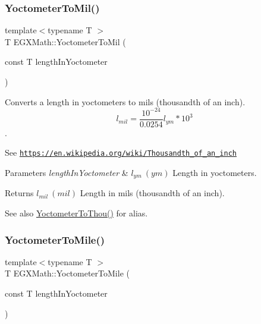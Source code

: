 \subsubsection{\texorpdfstring{Yoctometer\+To\+Mil()}{YoctometerToMil()}}
{\footnotesize\ttfamily template$<$typename T $>$ \\
T E\+G\+X\+Math\+::\+Yoctometer\+To\+Mil (\begin{DoxyParamCaption}\item[{const T}]{length\+In\+Yoctometer }\end{DoxyParamCaption})}



Converts a length in yoctometers to mils (thousandth of an inch). \[ l_{mil}= \frac{10^{-24}}{0.0254} l_{ym} * 10^{3} \]. 

See \href{https://en.wikipedia.org/wiki/Thousandth_of_an_inch}{\tt https\+://en.\+wikipedia.\+org/wiki/\+Thousandth\+\_\+of\+\_\+an\+\_\+inch} 
\begin{DoxyParams}{Parameters}
{\em length\+In\+Yoctometer} & $ l_{ym}\ (ym)$ Length in yoctometers. \\
\hline
\end{DoxyParams}
\begin{DoxyReturn}{Returns}
$ l_{mil}\ (mil)$ Length in mils (thousandth of an inch). 
\end{DoxyReturn}
\begin{DoxySeeAlso}{See also}
\mbox{\hyperlink{group___e_g_x_math-_conversions-_length_conversions-_s_i-_yoctometer-_imperial_ga9c2fbce1711afe0740edd868815ffea1}{Yoctometer\+To\+Thou()}} for alias. 
\end{DoxySeeAlso}
\mbox{\label{group___e_g_x_math-_conversions-_length_conversions-_s_i-_yoctometer-_imperial_gae40e8cf52937348b127013a3dbe89105}} 
\subsubsection{\texorpdfstring{Yoctometer\+To\+Mile()}{YoctometerToMile()}}
{\footnotesize\ttfamily template$<$typename T $>$ \\
T E\+G\+X\+Math\+::\+Yoctometer\+To\+Mile (\begin{DoxyParamCaption}\item[{const T}]{length\+In\+Yoctometer }\end{DoxyParamCaption})}



